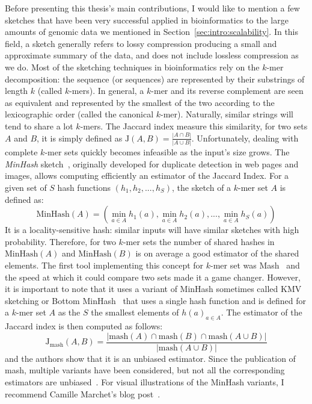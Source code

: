 Before presenting this thesis's main contributions, I would like to mention a few sketches that have been very successful applied in bioinformatics to the large amounts of genomic data we mentioned in Section~\ref{sec:intro:scalability}.
In this field, a sketch generally refers to lossy compression producing a small and approximate summary of the data, and does not include lossless compression as we do.
Most of the sketching techniques in bioinformatics rely on the $k$-mer decomposition: the sequence (or sequences) are represented by their substrings of length $k$ (called $k$-mers). In general, a $k$-mer and its reverse complement are seen as equivalent and represented by the smallest of the two according to the lexicographic order (called the canonical $k$-mer).
Naturally, similar strings will tend to share a lot $k$-mers. The Jaccard index measure this similarity, for two sets $A$ and $B$, it is simply defined as $ \mathrm{J}(A,B) = \frac{|A\cap B|}{|A \cup B|} $.
Unfortunately, dealing with complete $k$-mer sets quickly becomes infeasible as the input's size grows. 
The \textit{MinHash} sketch~\cite{MinHash97}, originally developed for duplicate detection in web pages and images, allows computing efficiently an estimator of the Jaccard Index. 
For a given set of $S$ hash functions $(h_1,h_2,...,h_S)$, the sketch of a $k$-mer set $A$ is defined as: $$ \mathrm{MinHash}(A) = (\min_{a \in A} h_1(a), \min_{a \in A} h_2(a), ..., \min_{a \in A} h_S(a) ) $$
%
It is a locality-sensitive hash: similar inputs will have similar sketches with high probability. Therefore, for two $k$-mer sets the number of shared hashes in $\mathrm{MinHash}(A)$ and $\mathrm{MinHash}(B)$ is on average a good estimator of the shared elements.
The first tool implementing this concept for $k$-mer set was Mash~\cite{ondov2016mash} and the speed at which it could compare two sets made it a game changer. However, it is important to note that it uses a variant of MinHash sometimes called KMV sketching or Bottom MinHash~\cite{bar2002counting} that uses a single hash function and is defined for a $k$-mer set $A$ as the $S$ the smallest elements of ${h(a)}_{a\in A}$. The estimator of the Jaccard index is then computed as follows: $$ \mathrm{J}_{\mathrm{mash}}(A,B) = \frac{|\mathrm{mash}(A)\cap \mathrm{mash}(B) \cap \mathrm{mash}(A \cup B) |}{|\mathrm{mash}(A \cup B)|}$$
and the authors show that it is an unbiased estimator. Since the publication of mash, multiple variants have been considered, but not all the corresponding estimators are unbiased~\cite{10.1093/bioinformatics/btac244}. For visual illustrations of the MinHash variants, I recommend Camille Marchet's blog post~\cite{camsketch}.

